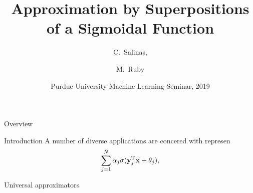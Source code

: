\documentclass[11pt,letterpape]{beamer}
\title[Approximation by a Sigmoidal Function] 
{Approximation by Superpositions of a Sigmoidal Function}
\author[C.\ Salinas, M.\ Ruby] 
{C.\ Salinas,%
  \and M.\ Ruby%
}
\institute[Purdue University] %
{
  Department of Mathematics\\
  Purdue University
 }
\date[Spring 2019] %
{Purdue University Machine Learning Seminar, 2019}
\begin{document}
\frame{\titlepage}
\begin{frame}{Overview}
  \tableofcontents
\end{frame}
\begin{frame}{Introduction}
  A number of diverse applications are concered with represen
  \[
    \sum_{j=1}^N\alpha_j\sigma(\mathbf{y}_j^{\mathrm{T}}\mathbf{x}+\theta_j),
  \]
\end{frame}
\begin{frame}{Universal approximators}
\end{frame}
\end{document}
